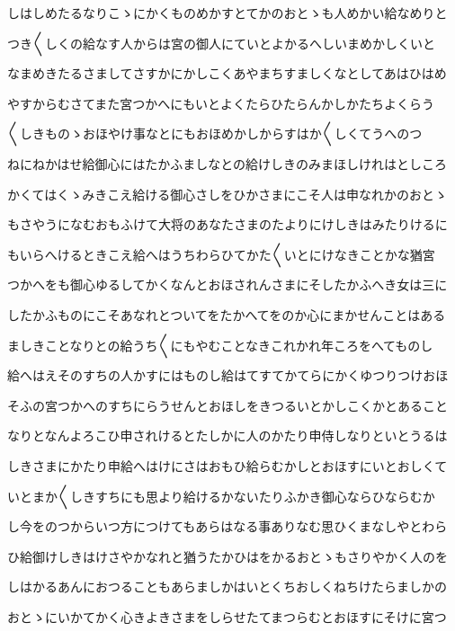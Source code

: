 \documentclass[a4paper,11pt,landscape]{ltjtarticle}
\begin{document}
\par\medskip
しはしめたるなりこゝにかくものめかすとてかのおとゝも人めかい給なめりと
\par\medskip
つき〱しくの給なす人からは宮の御人にていとよかるへしいまめかしくいと
\par\medskip
なまめきたるさましてさすかにかしこくあやまちすましくなとしてあはひはめ
\par\medskip
やすからむさてまた宮つかへにもいとよくたらひたらんかしかたちよくらう
\par\medskip
〱しきものゝおほやけ事なとにもおほめかしからすはか〱しくてうへのつ
\par\medskip
ねにねかはせ給御心にはたかふましなとの給けしきのみまほしけれはとしころ
\par\medskip
かくてはくゝみきこえ給ける御心さしをひかさまにこそ人は申なれかのおとゝ
\par\medskip
もさやうになむおもふけて大将のあなたさまのたよりにけしきはみたりけるに
\par\medskip
もいらへけるときこえ給へはうちわらひてかた〱いとにけなきことかな猶宮
\par\medskip
つかへをも御心ゆるしてかくなんとおほされんさまにそしたかふへき女は三に
\par\medskip
したかふものにこそあなれとついてをたかへてをのか心にまかせんことはある
\par\medskip
ましきことなりとの給うち〱にもやむことなきこれかれ年ころをへてものし
\par\medskip
給へはえそのすちの人かすにはものし給はてすてかてらにかくゆつりつけおほ
\par\medskip
そふの宮つかへのすちにらうせんとおほしをきつるいとかしこくかとあること
\par\medskip
なりとなんよろこひ申されけるとたしかに人のかたり申侍しなりといとうるは
\par\medskip
しきさまにかたり申給へはけにさはおもひ給らむかしとおほすにいとおしくて
\par\medskip
いとまか〱しきすちにも思より給けるかないたりふかき御心ならひならむか
\par\medskip
し今をのつからいつ方につけてもあらはなる事ありなむ思ひくまなしやとわら
\par\medskip
ひ給御けしきはけさやかなれと猶うたかひはをかるおとゝもさりやかく人のを
\par\medskip
しはかるあんにおつることもあらましかはいとくちおしくねちけたらましかの
\par\medskip
おとゝにいかてかく心きよきさまをしらせたてまつらむとおほすにそけに宮つ
\par\medskip
\end{document}
